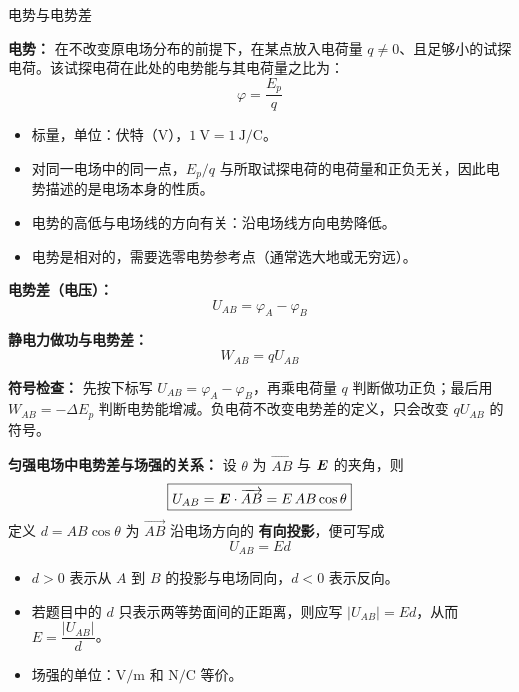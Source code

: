 \begin{conceptbox}{电势与电势差}

\textbf{电势：} 在不改变原电场分布的前提下，在某点放入电荷量
$q\ne0$、且足够小的试探电荷。该试探电荷在此处的电势能与其电荷量之比为：
\[
\varphi = \frac{E_p}{q}
\]

\begin{itemize}
  \item 标量，单位：伏特（$\mathrm{V}$），$1\ \mathrm{V} = 1\ \mathrm{J/C}$。
  \item 对同一电场中的同一点，$E_p/q$ 与所取试探电荷的电荷量和正负无关，因此电势描述的是电场本身的性质。
  \item 电势的高低与电场线的方向有关：沿电场线方向电势降低。
  \item 电势是相对的，需要选零电势参考点（通常选大地或无穷远）。
\end{itemize}

\textbf{电势差（电压）：}
\[
U_{AB} = \varphi_A - \varphi_B
\]

\textbf{静电力做功与电势差：}
\[
\boxed{W_{AB} = qU_{AB}}
\]

\textbf{符号检查：} 先按下标写 $U_{AB}=\varphi_A-\varphi_B$，再乘电荷量 $q$ 判断做功正负；最后用 $W_{AB}=-\Delta E_p$ 判断电势能增减。负电荷不改变电势差的定义，只会改变 $qU_{AB}$ 的符号。

\textbf{匀强电场中电势差与场强的关系：} 设 $\theta$ 为
$\overrightarrow{AB}$ 与 $\boldsymbol{E}$ 的夹角，则
\[
\boxed{U_{AB}=\boldsymbol{E}\cdot\overrightarrow{AB}
=E\,AB\cos\theta}
\]
定义 $d=AB\cos\theta$ 为 $\overrightarrow{AB}$ 沿电场方向的
\textbf{有向投影}，便可写成
\[
\boxed{U_{AB}=Ed}
\]

\begin{itemize}
  \item $d>0$ 表示从 $A$ 到 $B$ 的投影与电场同向，$d<0$ 表示反向。
  \item 若题目中的 $d$ 只表示两等势面间的正距离，则应写
  $|U_{AB}|=Ed$，从而 $E=\dfrac{|U_{AB}|}{d}$。
  \item 场强的单位：$\mathrm{V/m}$ 和 $\mathrm{N/C}$ 等价。
\end{itemize}

\begin{center}


\label{fig:potential-diff}
\end{center}

\end{conceptbox}

